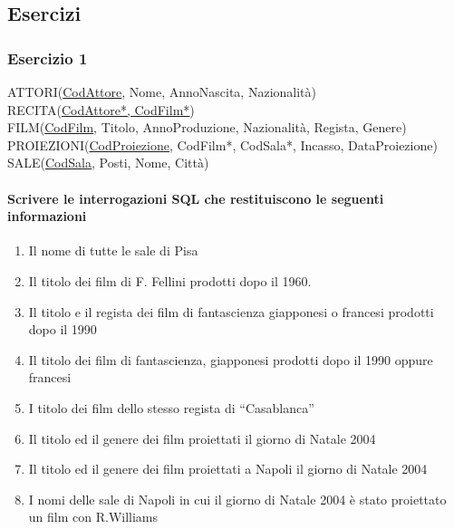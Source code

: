 \documentclass[a4paper]{article}
\begin{document}
\subsection{Esercizi}
\subsubsection{Esercizio 1}
ATTORI(\underline{CodAttore}, Nome, AnnoNascita, Nazionalità)\\
RECITA(\underline{CodAttore*, CodFilm*})\\
FILM(\underline{CodFilm}, Titolo, AnnoProduzione, Nazionalità, Regista, Genere)\\
PROIEZIONI(\underline{CodProiezione}, CodFilm*, CodSala*, Incasso, DataProiezione)\\
SALE(\underline{CodSala}, Posti, Nome, Città)
%
\paragraph{Scrivere le interrogazioni SQL che restituiscono le seguenti informazioni}
\begin{enumerate}
\item Il nome di tutte le sale di Pisa
\item Il titolo dei film di F. Fellini prodotti dopo il 1960.
\item Il titolo e il regista dei film di fantascienza giapponesi o francesi prodotti dopo il 1990
\item Il titolo dei film di fantascienza, giapponesi prodotti dopo il 1990 oppure francesi
\item I titolo dei film dello stesso regista di “Casablanca”
\item Il titolo ed  il genere dei film proiettati il giorno di Natale 2004
\item  Il titolo ed  il genere dei film proiettati a Napoli il giorno di Natale 2004
\item  I nomi delle sale di Napoli in cui  il giorno di Natale 2004 è stato proiettato un film con R.Williams
\end{enumerate}
\end{document}
